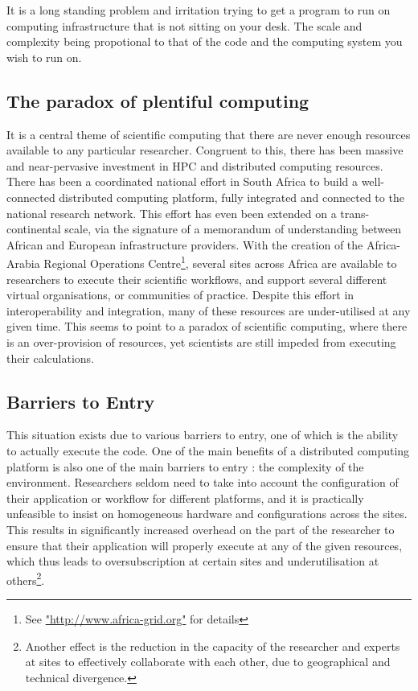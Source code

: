 \documentclass[a4paper]{jpconf}
\begin{document}
    It is a long standing problem and irritation trying to get a program to run on
    computing infrastructure that is not sitting on your desk. The scale and complexity being 
    propotional to that of the code and the computing system you wish to run on.

	\subsection{The paradox of  plentiful computing}

    It is a central theme of scientific computing that there are never enough resources available to
    any particular researcher. Congruent to this, there has
    been massive and near-pervasive investment in HPC and distributed computing resources. There has
    been a coordinated national effort in South Africa to build a well-connected distributed computing
    platform\cite{SAGrid}, fully integrated and connected to the national research
    network\cite{SANREN}. This effort has even been extended on a trans-continental scale, via the
    signature of a memorandum of understanding between African and European infrastructure
    providers\cite{AAROC}. With the creation of the Africa-Arabia Regional Operations
    Centre\footnote{See \url{"http://www.africa-grid.org"} for details}, several sites across Africa
    are available to researchers to execute their scientific workflows, and support several
    different virtual organisations, or communities of practice. Despite this effort in
    interoperability and integration, many of these resources are under-utilised at any given time.
    This seems to point to a paradox of scientific computing, where there is an over-provision of
    resources, yet scientists are still impeded from executing their calculations.

	\subsection{Barriers to Entry}

    This situation exists due to various barriers to entry, one of which is the ability
    to actually execute the code. One of the main benefits of a distributed computing
    platform is also one of the main barriers to entry : the complexity of the environment.
    Researchers seldom need to take into account the configuration of their application or workflow
    for different platforms, and it is practically unfeasible to insist on homogeneous hardware and
    configurations across the sites. This results in significantly increased overhead on the part of
    the researcher to ensure that their application will properly execute at any of the given
    resources, which thus leads to oversubscription at certain sites and underutilisation at
    others\footnote{Another effect is the reduction in the capacity of the researcher and experts at
    sites to effectively collaborate with each other, due to geographical and technical
    divergence.}.
\end{document}
